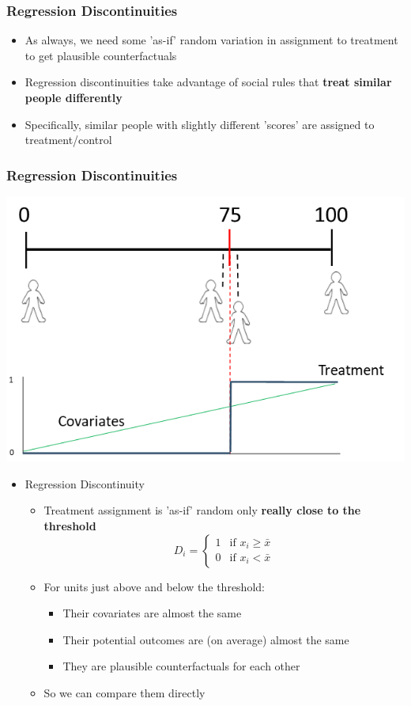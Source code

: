 \documentclass[xcolor=x11names,compress]{beamer}\usepackage[]{graphicx}\usepackage[]{color}
\renewcommand{\(}{\begin{columns}}
\renewcommand{\)}{\end{columns}}
\newcommand{\<}[1]{\begin{column}{#1}}
\renewcommand{\>}{\end{column}}
\begin{document}
\begin{frame}
\frametitle{Regression Discontinuities}
\begin{itemize}
\item As always, we need some 'as-if' random variation in assignment to treatment to get plausible counterfactuals
\pause
\item Regression discontinuities take advantage of social rules that \textbf{treat similar people differently}
\pause
\item Specifically, similar people with slightly different 'scores' are assigned to treatment/control
\end{itemize}
\end{frame}

\begin{frame}
\frametitle{Regression Discontinuities}
\begin{center}
\includegraphics[scale=0.45]{Scale.png}
\end{center}
\end{frame}

\begin{frame}
\begin{itemize}
\item Regression Discontinuity
\begin{itemize}
\item Treatment assignment is 'as-if' random only \textbf{really close to the threshold}
\pause
\[
D_i=
\begin{cases}
1 & \text{if }x_i \geq \bar{x} \\
0 & \text{if }x_i < \bar{x}
\end{cases}
\]
\pause
\item For units just above and below the threshold:
\begin{itemize}
\item Their covariates are almost the same
\item Their potential outcomes are (on average) almost the same
\item They are plausible counterfactuals for each other
\end{itemize}
\pause
\item So we can compare them directly
\end{itemize}
\end{itemize}
\end{frame}
\end{document}
